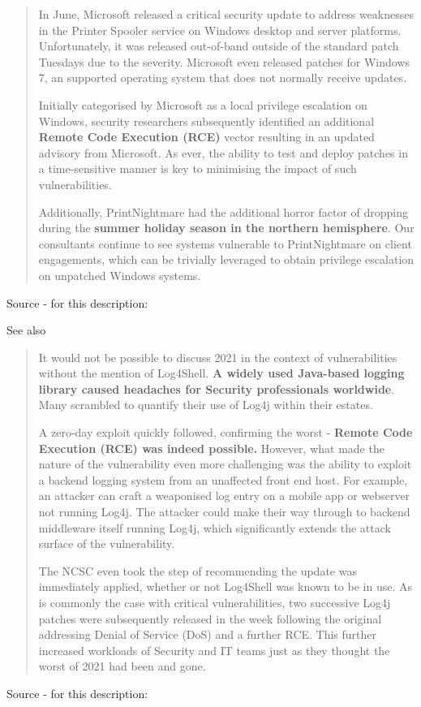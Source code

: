 \documentclass[Screen16to9,17pt]{foils}
\begin{document}
\begin{quote} \small
In June, Microsoft released a critical security update to address weaknesses in the Printer Spooler service on Windows desktop and server platforms. Unfortunately, it was released out-of-band outside of the standard patch Tuesdays due to the severity. Microsoft even released patches for Windows 7, an supported operating system that does not normally receive updates.

Initially categorised by Microsoft as a local privilege escalation on Windows, security researchers subsequently identified an additional {\bf Remote Code Execution (RCE)} vector resulting in an updated advisory from Microsoft. As ever, the ability to test and deploy patches in a time-sensitive manner is key to minimising the impact of such vulnerabilities.

Additionally, PrintNightmare had the additional horror factor of dropping during the {\bf summer holiday season in the northern hemisphere}. Our consultants continue to see systems vulnerable to PrintNightmare on client engagements, which can be trivially leveraged to obtain privilege escalation on unpatched Windows systems.
\end{quote}

Source - for this description:\\

See also 

\begin{quote}\small
It would not be possible to discuss 2021 in the context of vulnerabilities without the mention of Log4Shell. {\bf A widely used Java-based logging library caused headaches for Security professionals worldwide}. Many scrambled to quantify their use of Log4j within their estates.

A zero-day exploit quickly followed, confirming the worst - {\bf Remote Code Execution (RCE) was indeed possible.} However, what made the nature of the vulnerability even more challenging was the ability to exploit a backend logging system from an unaffected front end host. For example, an attacker can craft a weaponised log entry on a mobile app or webserver not running Log4j. The attacker could make their way through to backend middleware itself running Log4j, which significantly extends the attack surface of the vulnerability.

The NCSC even took the step of recommending the update was immediately applied, whether or not Log4Shell was known to be in use. As is commonly the case with critical vulnerabilities, two successive Log4j patches were subsequently released in the week following the original addressing Denial of Service (DoS) and a further RCE. This further increased workloads of Security and IT teams just as they thought the worst of 2021 had been and gone.
\end{quote}
Source - for this description:\\
\end{document}
